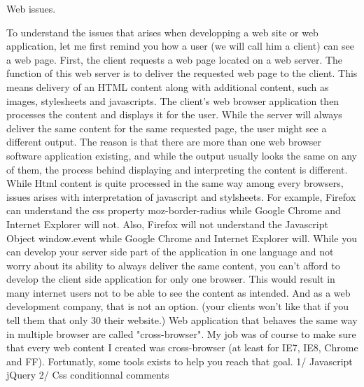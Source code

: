 Web issues.

 
To understand the issues that arises when developping a web site or web application, let me first remind you how a 
user (we will call him a client) can see a web page. First, the client requests a web page located on a web server. The function of this web server is 
to deliver the requested web page to the client. This means delivery of an HTML content along with additional content, 
such as images, stylesheets and javascripts. The client's web browser application then processes the content and displays it for the user. 
While the server will always deliver the same content for the same requested page, the user might see a different output. 
The reason is that there are more than one web browser software application existing, and while the output usually looks the same on any of them, the process behind 
displaying and interpreting the content is different. While Html content is quite processed in the same way among every browsers, issues arises with interpretation of
javascript and stylsheets. For example, Firefox can understand the css property moz-border-radius while Google Chrome and Internet Explorer will not. Also, Firefox 
will not understand the Javascript Object window.event while Google Chrome and Internet Explorer will.
While you can develop your server side part of the application in one language and not worry about its ability to always deliver the same content, you can't afford to
develop the client side application for only one browser. This would result in many internet users not to be able to see the content as intended.
And as a web development company, that is not an option. (your clients won't like that if you tell them that only 30 %
their website.)
Web application that behaves the same way in multiple browser are called "cross-browser". 
My job was of course to make sure that every web content I created was cross-browser (at least for IE7, IE8, Chrome and FF).
Fortunatly, some tools exists to help you reach that goal.
1/ Javascript
jQuery
2/ Css
conditionnal comments
